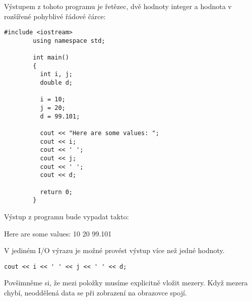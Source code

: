 \begin{mdframed}[style=mdexam]
  \begin{example}\label{cpp:exam003}
    Výstupem z tohoto programu je řetězec, dvě hodnoty integer a hodnota v rozšířené pohyblivé
    řádové čárce: 
      \begin{lstlisting}[style=luaCPPStyle]
        #include <iostream> 
        using namespace std;
        
        int main()
        {
          int i, j; 
          double d;

          i = 10; 
          j = 20; 
          d = 99.101;
          
          cout << "Here are some values: "; 
          cout << i; 
          cout << ' '; 
          cout << j;
          cout << ' '; 
          cout << d;

          return 0;
        }
      \end{lstlisting}
    Výstup z programu bude vypadat takto: 
    \begin{mdframed}[style=mdmsdos]
      Here are some values: 10 20 99.101
    \end{mdframed}

    V jediném I/O výrazu je možné provést výstup více než jedné hodnoty. 
      \begin{lstlisting}[style=luaCPPStyle]
        cout << i << ' ' << j << ' ' << d;
      \end{lstlisting}
    Povšimněme si, že mezi položky musíme explicitně vložit mezery. Když mezera chybí, neoddělená
    data se při zobrazení na obrazovce spojí.
  \end{example}
\end{mdframed}